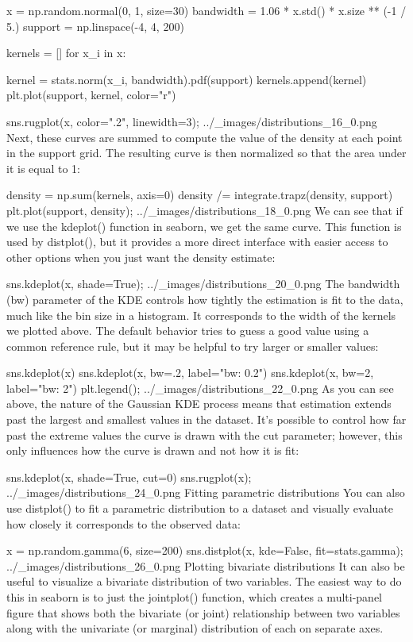 x = np.random.normal(0, 1, size=30)
bandwidth = 1.06 * x.std() * x.size ** (-1 / 5.)
support = np.linspace(-4, 4, 200)

kernels = []
for x_i in x:

    kernel = stats.norm(x_i, bandwidth).pdf(support)
    kernels.append(kernel)
    plt.plot(support, kernel, color="r")

sns.rugplot(x, color=".2", linewidth=3);
../_images/distributions_16_0.png
Next, these curves are summed to compute the value of the density at each point in the support grid. The resulting curve is then normalized so that the area under it is equal to 1:

density = np.sum(kernels, axis=0)
density /= integrate.trapz(density, support)
plt.plot(support, density);
../_images/distributions_18_0.png
We can see that if we use the kdeplot() function in seaborn, we get the same curve. This function is used by distplot(), but it provides a more direct interface with easier access to other options when you just want the density estimate:

sns.kdeplot(x, shade=True);
../_images/distributions_20_0.png
The bandwidth (bw) parameter of the KDE controls how tightly the estimation is fit to the data, much like the bin size in a histogram. It corresponds to the width of the kernels we plotted above. The default behavior tries to guess a good value using a common reference rule, but it may be helpful to try larger or smaller values:

sns.kdeplot(x)
sns.kdeplot(x, bw=.2, label="bw: 0.2")
sns.kdeplot(x, bw=2, label="bw: 2")
plt.legend();
../_images/distributions_22_0.png
As you can see above, the nature of the Gaussian KDE process means that estimation extends past the largest and smallest values in the dataset. It’s possible to control how far past the extreme values the curve is drawn with the cut parameter; however, this only influences how the curve is drawn and not how it is fit:

sns.kdeplot(x, shade=True, cut=0)
sns.rugplot(x);
../_images/distributions_24_0.png
Fitting parametric distributions
You can also use distplot() to fit a parametric distribution to a dataset and visually evaluate how closely it corresponds to the observed data:

x = np.random.gamma(6, size=200)
sns.distplot(x, kde=False, fit=stats.gamma);
../_images/distributions_26_0.png
Plotting bivariate distributions
It can also be useful to visualize a bivariate distribution of two variables. The easiest way to do this in seaborn is to just the jointplot() function, which creates a multi-panel figure that shows both the bivariate (or joint) relationship between two variables along with the univariate (or marginal) distribution of each on separate axes.

